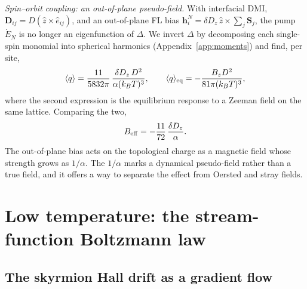 \documentclass[aps,prb,twocolumn,superscriptaddress,longbibliography,floatfix]{revtex4-2}
\newcommand{\vS}{\mathbf S}
\newcommand{\vh}{\mathbf h}
\newcommand{\kT}{k_BT}
\newcommand{\Beff}{B_{\rm eff}}
\newcommand{\avg}[1]{\langle #1\rangle}
\begin{document}
\emph{Spin--orbit coupling: an out-of-plane pseudo-field.} With interfacial DMI, $\mathbf D_{ij}=D(\hat z\times\hat e_{ij})$, and an out-of-plane FL bias $\vh^N_i=\delta D_z\,\hat z\times\sum_j\vS_j$, the pump $\dot E_N$ is no longer an eigenfunction of $\Delta$. We invert $\Delta$ by decomposing each single-spin monomial into spherical harmonics (Appendix~\ref{app:moments}) and find, per site,
\begin{equation}
\avg{q}=\frac{11}{5832\pi}\,\frac{\delta D_z\,D^2}{\alpha(\kT)^3},\qquad \avg{q}_{\rm eq}=-\frac{B_zD^2}{81\pi(\kT)^3},
\label{eq:soc}
\end{equation}
where the second expression is the equilibrium response to a Zeeman field on the same lattice. Comparing the two,
\begin{equation}
\Beff=-\frac{11}{72}\,\frac{\delta D_z}{\alpha}.
\label{eq:Beff}
\end{equation}
The out-of-plane bias acts on the topological charge as a magnetic field whose strength grows as $1/\alpha$. The $1/\alpha$ marks a dynamical pseudo-field rather than a true field, and it offers a way to separate the effect from Oersted and stray fields.

\section{Low temperature: the stream-function Boltzmann law}\label{sec:lowT}

\subsection{The skyrmion Hall drift as a gradient flow}
\end{document}
